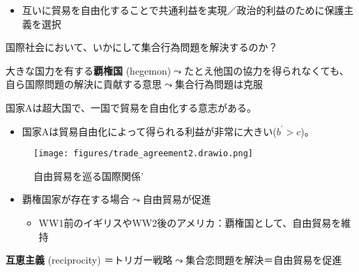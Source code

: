 \documentclass[
  xelatex,
  ja=standard]{bxjsarticle}
\providecommand{\tightlist}{%
  \setlength{\itemsep}{0pt}\setlength{\parskip}{0pt}}\usepackage{longtable,booktabs,array}
\begin{document}
\begin{itemize}
\tightlist
\item
  互いに貿易を自由化することで共通利益を実現／政治的利益のために保護主義を選択
\end{itemize}

国際社会において、いかにして集合行為問題を解決するのか？

大きな国力を有する\textbf{覇権国}
(hegemon)\(\leadsto\)たとえ他国の協力を得られなくても、自ら国際問題の解決に貢献する意思\(\leadsto\)集合行為問題は克服\citep{lake1993}

\begin{tcolorbox}[enhanced jigsaw, toprule=.15mm, leftrule=.75mm, coltitle=black, opacityback=0, colback=white, title=\textcolor{quarto-callout-tip-color}{\faLightbulb}\hspace{0.5em}{自由貿易を巡る国際関係'}, rightrule=.15mm, bottomrule=.15mm, colbacktitle=quarto-callout-tip-color!10!white, opacitybacktitle=0.6, titlerule=0mm, colframe=quarto-callout-tip-color-frame, bottomtitle=1mm, toptitle=1mm, arc=.35mm, left=2mm, breakable]

国家Aは超大国で、一国で貿易を自由化する意志がある。

\begin{itemize}
\tightlist
\item
  国家Aは貿易自由化によって得られる利益が非常に大きい(\(b^\prime > c\))。
\end{itemize}

\end{tcolorbox}

\begin{figure}[htpb]

{\centering \texttt{[image: figures/trade\_agreement2.drawio.png]}

}

\caption{自由貿易を巡る国際関係'}

\end{figure}

\begin{itemize}
\tightlist
\item
  覇権国家が存在する場合\(\leadsto\)自由貿易が促進

  \begin{itemize}
  \tightlist
  \item
    WW1前のイギリスやWW2後のアメリカ：覇権国として、自由貿易を維持
  \end{itemize}
\end{itemize}

\textbf{互恵主義} (reciprocity)
＝トリガー戦略\(\leadsto\)集合恋問題を解決＝自由貿易を促進
\end{document}
